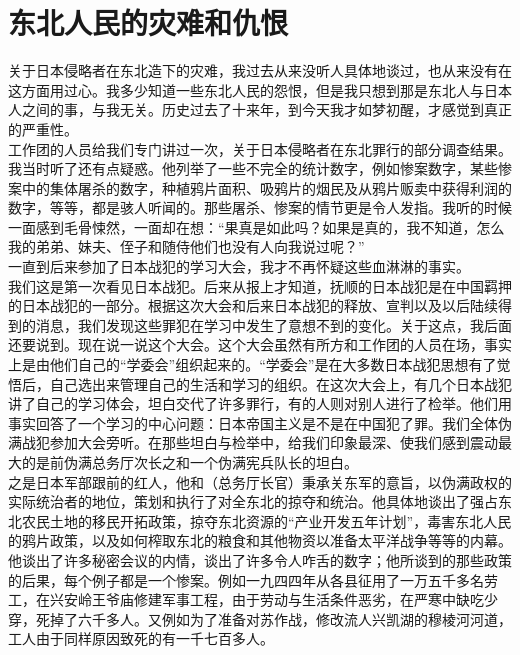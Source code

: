 \fancyhead[RO]{} %
\fancyhead[LE]{} %
\chapter*{东北人民的灾难和仇恨}
\thispagestyle{empty}
关于日本侵略者在东北造下的灾难，我过去从来没听人具体地谈过，也从来没有在这方面用过心。我多少知道一些东北人民的怨恨，但是我只想到那是东北人与日本人之间的事，与我无关。历史过去了十来年，到今天我才如梦初醒，才感觉到真正的严重性。\\

工作团的人员给我们专门讲过一次，关于日本侵略者在东北罪行的部分调查结果。我当时听了还有点疑惑。他列举了一些不完全的统计数字，例如惨案数字，某些惨案中的集体屠杀的数字，种植鸦片面积、吸鸦片的烟民及从鸦片贩卖中获得利润的数字，等等，都是骇人听闻的。那些屠杀、惨案的情节更是令人发指。我听的时候一面感到毛骨悚然，一面却在想：“果真是如此吗？如果是真的，我不知道，怎么我的弟弟、妹夫、侄子和随侍他们也没有人向我说过呢？”\\

一直到后来参加了日本战犯的学习大会，我才不再怀疑这些血淋淋的事实。\\

我们这是第一次看见日本战犯。后来从报上才知道，抚顺的日本战犯是在中国羁押的日本战犯的一部分。根据这次大会和后来日本战犯的释放、宣判以及以后陆续得到的消息，我们发现这些罪犯在学习中发生了意想不到的变化。关于这点，我后面还要说到。现在说一说这个大会。这个大会虽然有所方和工作团的人员在场，事实上是由他们自己的“学委会”组织起来的。“学委会”是在大多数日本战犯思想有了觉悟后，自己选出来管理自己的生活和学习的组织。在这次大会上，有几个日本战犯讲了自己的学习体会，坦白交代了许多罪行，有的人则对别人进行了检举。他们用事实回答了一个学习的中心问题：日本帝国主义是不是在中国犯了罪。我们全体伪满战犯参加大会旁听。在那些坦白与检举中，给我们印象最深、使我们感到震动最大的是前伪满总务厅次长之和一个伪满宪兵队长的坦白。\\

之是日本军部跟前的红人，他和（总务厅长官）秉承关东军的意旨，以伪满政权的实际统治者的地位，策划和执行了对全东北的掠夺和统治。他具体地谈出了强占东北农民土地的移民开拓政策，掠夺东北资源的“产业开发五年计划”，毒害东北人民的鸦片政策，以及如何榨取东北的粮食和其他物资以准备太平洋战争等等的内幕。他谈出了许多秘密会议的内情，谈出了许多令人咋舌的数字；他所谈到的那些政策的后果，每个例子都是一个惨案。例如一九四四年从各县征用了一万五千多名劳工，在兴安岭王爷庙修建军事工程，由于劳动与生活条件恶劣，在严寒中缺吃少穿，死掉了六千多人。又例如为了准备对苏作战，修改流人兴凯湖的穆棱河河道，工人由于同样原因致死的有一千七百多人。\\

